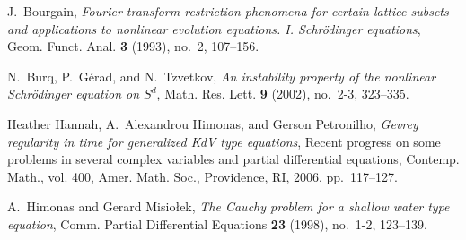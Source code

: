 \providecommand{\bysame}{\leavevmode\hbox to3em{\hrulefill}\thinspace}
\providecommand{\MR}{\relax\ifhmode\unskip\space\fi MR }
\providecommand{\MRhref}[2]{%
  \href{http://www.ams.org/mathscinet-getitem?mr=#1}{#2}
}
\providecommand{\href}[2]{#2}
\begin{thebibliography}{1}

J.~Bourgain, \emph{Fourier transform restriction phenomena for certain lattice
  subsets and applications to nonlinear evolution equations. {I}.
  {S}chr{\"o}dinger equations}, Geom. Funct. Anal. \textbf{3} (1993), no.~2,
  107--156. 

N.~Burq, P.~G{{\'e}}rad, and N.~Tzvetkov, \emph{An instability property of the
  nonlinear {S}chr{\"o}dinger equation on {$S^d$}}, Math. Res. Lett. \textbf{9}
  (2002), no.~2-3, 323--335. 

Heather Hannah, A.~Alexandrou Himonas, and Gerson Petronilho, \emph{Gevrey
  regularity in time for generalized {K}d{V} type equations}, Recent progress
  on some problems in several complex variables and partial differential
  equations, Contemp. Math., vol. 400, Amer. Math. Soc., Providence, RI, 2006,
  pp.~117--127. 

A.~Himonas and Gerard Misio{\l}ek, \emph{The {C}auchy problem for a shallow
  water type equation}, Comm. Partial Differential Equations \textbf{23}
  (1998), no.~1-2, 123--139. 

\end{thebibliography}
%
%

